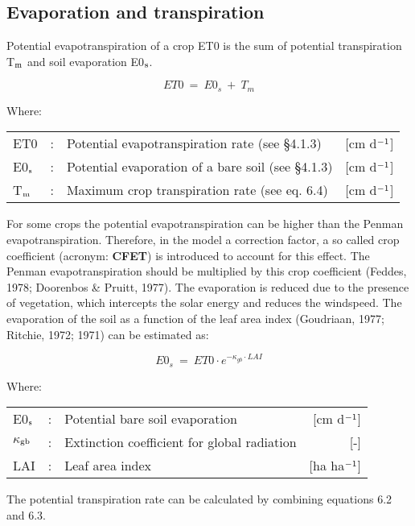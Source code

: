 \subsection{Evaporation and transpiration}
Potential evapotranspiration of a crop ET0 is the sum of potential transpiration T$_{{\rm m}}$ and
soil evaporation E0$_{{\rm s}}$.

\begin{equation}
ET0 ~=~ E0_{s} ~+~ T_{m} 
\end{equation}
 
Where:\\[5pt]
\begin{tabularx}{\textwidth}{llXr}
ET0 &:& Potential evapotranspiration rate (see \S 4.1.3) & [cm d$^{{\rm -1}}$]\\
E0$_{{\rm s}}$ &:& Potential evaporation of a bare soil (see \S 4.1.3)  & [cm d$^{{\rm -1}}$]\\
T$_{{\rm m}}$ &:& Maximum crop transpiration rate (see eq. 6.4)  & [cm d$^{{\rm -1}}$]\\
\end{tabularx}

For some crops the potential evapotranspiration can be higher than the Penman evapotran\-spiration. 
Therefore, in the model a correction factor, a so called  crop coefficient
(acronym: {\bf CFET}) is introduced to account for this effect. The Penman evapotranspiration
should be multiplied by this crop coefficient (Feddes, 1978; Doorenbos \& Pruitt, 1977).
The evaporation is reduced due to the presence of vegetation, which intercepts the solar
energy and reduces the windspeed. The evaporation of the soil as a function of the leaf
area index (Goudriaan, 1977; Ritchie, 1972; 1971) can be estimated as:

\begin{equation}
E0 _{s} ~=~ ET0 \cdot e^{-\kappa_{gb} \cdot LAI}
\end{equation}

Where:\\[5pt]
\begin{tabularx}{\textwidth}{llXr}
E0$_{{\rm s}}$ &:& Potential bare soil evaporation  & [cm d$^{{\rm -1}}$]\\
 $\kappa$$_{{\rm gb}}$ &:& Extinction coefficient for global radiation  & [-]\\
 LAI &:& Leaf area index  & [ha ha$^{{\rm -1}}$]\\
\end{tabularx}
 
The potential transpiration rate can be calculated by combining equations 6.2 and 6.3.

